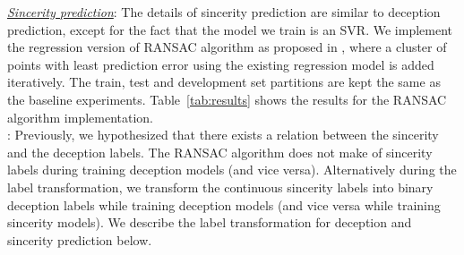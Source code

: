 \documentclass{article}
\begin{document}
\noindent\underline{\it Sincerity prediction}: 
The details of sincerity prediction are similar to deception prediction, except for the fact that the model we train is an SVR.
We implement the regression version of RANSAC algorithm as proposed in \cite{}, where a cluster of points with least prediction error using the existing regression model is added iteratively. 
The train, test and development set partitions are kept the same as the baseline experiments.
Table~\ref{tab:results} shows the results for the RANSAC algorithm implementation.
\\

:
Previously, we hypothesized that there exists a relation between the sincerity and the deception labels.
The RANSAC algorithm does not make of sincerity labels during training deception models (and vice versa). 
Alternatively during the label transformation, we transform the continuous sincerity labels into binary deception labels while training deception models (and vice versa while training sincerity models).
We describe the label transformation for deception and sincerity prediction below.
\\
\end{document}
